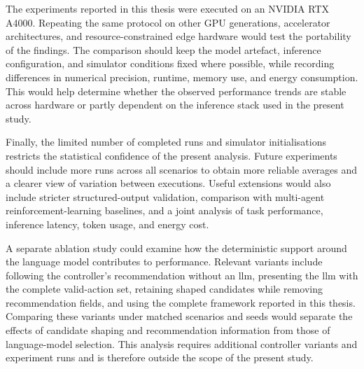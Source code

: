 The experiments reported in this thesis were executed on an NVIDIA RTX A4000. Repeating the same protocol on other GPU generations, accelerator architectures, and resource-constrained edge hardware would test the portability of the findings. The comparison should keep the model artefact, inference configuration, and simulator conditions fixed where possible, while recording differences in numerical precision, runtime, memory use, and energy consumption. This would help determine whether the observed performance trends are stable across hardware or partly dependent on the inference stack used in the present study.

Finally, the limited number of completed runs and simulator initialisations restricts the statistical confidence of the present analysis. Future experiments should include more runs across all scenarios to obtain more reliable averages and a clearer view of variation between executions. Useful extensions would also include stricter structured-output validation, comparison with multi-agent reinforcement-learning baselines, and a joint analysis of task performance, inference latency, token usage, and energy cost.

A separate ablation study could examine how the deterministic support around the language model contributes to performance. Relevant variants include following the controller's recommendation without an \gls{llm}, presenting the \gls{llm} with the complete valid-action set, retaining shaped candidates while removing recommendation fields, and using the complete framework reported in this thesis. Comparing these variants under matched scenarios and seeds would separate the effects of candidate shaping and recommendation information from those of language-model selection. This analysis requires additional controller variants and experiment runs and is therefore outside the scope of the present study.
